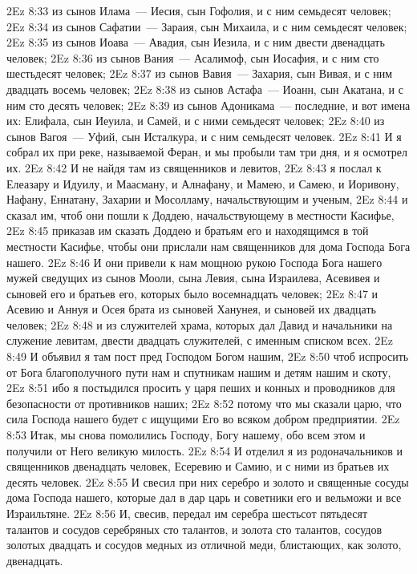 \vs 2Ez 8:33 из сынов Илама~--- Иесия, сын Гофолия, и с ним семьдесят человек;
\vs 2Ez 8:34 из сынов Сафатии~--- Зараия, сын Михаила, и с ним семьдесят человек;
\vs 2Ez 8:35 из сынов Иоава~--- Авадия, сын Иезила, и с ним двести двенадцать человек;
\vs 2Ez 8:36 из сынов Вания~--- Асалимоф, сын Иосафия, и с ним сто шестьдесят человек;
\vs 2Ez 8:37 из сынов Вавия~--- Захария, сын Вивая, и с ним двадцать восемь человек;
\vs 2Ez 8:38 из сынов Астафа~--- Иоанн, сын Акатана, и с ним сто десять человек;
\vs 2Ez 8:39 из сынов Адоникама~--- последние, и вот имена их: Елифала, сын Иеуила, и Самей, и с ними семьдесят человек;
\vs 2Ez 8:40 из сынов Вагоя~--- Уфий, сын Исталкура, и с ним семьдесят человек.
\vs 2Ez 8:41 И я собрал их при реке, называемой Феран, и мы пробыли там три дня, и я осмотрел их.
\vs 2Ez 8:42 И не найдя там  из священников и левитов,
\vs 2Ez 8:43 я послал к Елеазару и Идуилу, и Маасману, и Алнафану, и Мамею, и Самею, и Иоривону, Нафану, Еннатану, Захарии и Мосолламу, начальствующим и ученым,
\vs 2Ez 8:44 и сказал им, чтоб они пошли к Доддею, начальствующему в местности Касифье,
\vs 2Ez 8:45 приказав им сказать Доддею и братьям его и находящимся в той местности Касифье, чтобы они прислали нам священников для дома Господа Бога нашего.
\vs 2Ez 8:46 И они привели к нам мощною рукою Господа Бога нашего мужей сведущих из сынов Мооли, сына Левия, сына Израилева, Асевивея и сыновей его и братьев его, которых было восемнадцать человек;
\vs 2Ez 8:47 и Асевию и Аннуя и Осея брата из сыновей Ханунея, и сыновей их двадцать человек;
\vs 2Ez 8:48 и из служителей храма, которых дал Давид и начальники на служение левитам, двести двадцать служителей, с именным списком всех.
\vs 2Ez 8:49 И объявил я там пост пред Господом Богом нашим,
\vs 2Ez 8:50 чтоб испросить от Бога благополучного пути нам и спутникам нашим и детям нашим и скоту,
\vs 2Ez 8:51 ибо я постыдился просить у царя пеших и конных и проводников для безопасности от противников наших;
\vs 2Ez 8:52 потому что мы сказали царю, что сила Господа нашего будет с ищущими Его во всяком добром предприятии.
\rsbpar\vs 2Ez 8:53 Итак, мы снова помолились Господу, Богу нашему, обо всем этом и получили от Него великую милость.
\vs 2Ez 8:54 И отделил я из родоначальников и священников двенадцать человек, Есеревию и Самию, и с ними из братьев их десять человек.
\vs 2Ez 8:55 И свесил при них серебро и золото и священные сосуды дома Господа нашего, которые дал в дар царь и советники его и вельможи и все Израильтяне.
\vs 2Ez 8:56 И, свесив, передал им серебра шестьсот пятьдесят талантов и сосудов серебряных сто талантов, и золота сто талантов, сосудов золотых двадцать и сосудов медных из отличной меди, блистающих, как золото, двенадцать.
